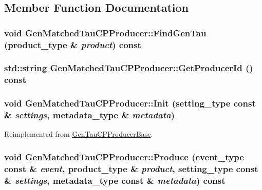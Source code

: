 \subsection{Member Function Documentation}
\hypertarget{classGenMatchedTauCPProducer_adaea763e2be4277c47ffc9685aac25bc}{
\subsubsection[{FindGenTau}]{\setlength{\rightskip}{0pt plus 5cm}void GenMatchedTauCPProducer::FindGenTau (product\_\-type \& {\em product}) const}}
\label{classGenMatchedTauCPProducer_adaea763e2be4277c47ffc9685aac25bc}
\hypertarget{classGenMatchedTauCPProducer_ab061481ec0e31a5e9c37093521c5efbb}{
\subsubsection[{GetProducerId}]{\setlength{\rightskip}{0pt plus 5cm}std::string GenMatchedTauCPProducer::GetProducerId () const}}
\label{classGenMatchedTauCPProducer_ab061481ec0e31a5e9c37093521c5efbb}
\hypertarget{classGenMatchedTauCPProducer_a408a6629682820189c1236cd6453374c}{
\subsubsection[{Init}]{\setlength{\rightskip}{0pt plus 5cm}void GenMatchedTauCPProducer::Init (setting\_\-type const \& {\em settings}, \/  metadata\_\-type \& {\em metadata})}}
\label{classGenMatchedTauCPProducer_a408a6629682820189c1236cd6453374c}


Reimplemented from \hyperlink{classGenTauCPProducerBase_a5eacebc116568fa618c6171e5e04fd09}{GenTauCPProducerBase}.\hypertarget{classGenMatchedTauCPProducer_a82b615c1d349a3f1d65ede4379e18758}{
\subsubsection[{Produce}]{\setlength{\rightskip}{0pt plus 5cm}void GenMatchedTauCPProducer::Produce (event\_\-type const \& {\em event}, \/  product\_\-type \& {\em product}, \/  setting\_\-type const \& {\em settings}, \/  metadata\_\-type const \& {\em metadata}) const}}
\label{classGenMatchedTauCPProducer_a82b615c1d349a3f1d65ede4379e18758}


